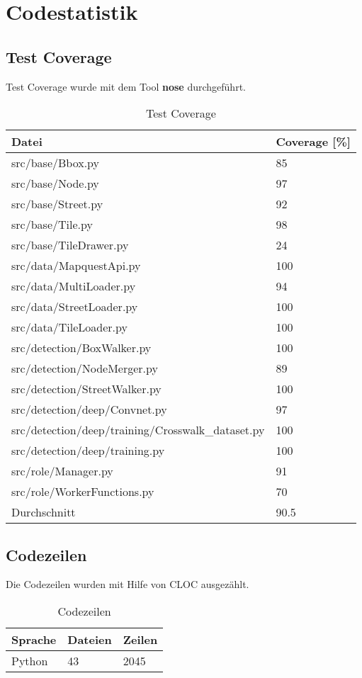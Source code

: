 \section{Codestatistik}
\subsection{Test Coverage}
Test Coverage wurde mit dem Tool \textbf{nose} durchgeführt. \\

\begin{table}[H]
\centering
    \begin{tabular}{|l|l|}
    \hline    
    \rowcolor{lightblue}
	Datei & Coverage [\%] \\ \hline
	src/base/Bbox.py & 85 \\ \hline    
	src/base/Node.py & 97 \\ \hline   
	src/base/Street.py & 92 \\ \hline  
	src/base/Tile.py & 98 \\ \hline   
	src/base/TileDrawer.py & 24 \\ \hline  
	src/data/MapquestApi.py & 100 \\ \hline   
	src/data/MultiLoader.py & 94 \\ \hline   
	src/data/StreetLoader.py & 100 \\ \hline   
	src/data/TileLoader.py & 100 \\ \hline   
	src/detection/BoxWalker.py & 100 \\ \hline   
	src/detection/NodeMerger.py & 89 \\ \hline  
	src/detection/StreetWalker.py & 100 \\ \hline   
	src/detection/deep/Convnet.py & 97 \\ \hline   
	src/detection/deep/training/Crosswalk\_dataset.py & 100 \\ \hline  
	src/detection/deep/training.py & 100 \\ \hline   
	src/role/Manager.py & 91 \\ \hline  
	src/role/WorkerFunctions.py & 70 \\ \hline
	\rowcolor{lightblue}
	Durchschnitt &   90.5 \\ \hline
    \end{tabular}
    \caption[Test Coverage]{Test Coverage}
\end{table}

\subsection{Codezeilen}
Die Codezeilen wurden mit Hilfe von CLOC \cite{CLOC} ausgezählt. \\

\begin{table}[H]
\centering
    \begin{tabular}{|p{3cm} |p{3cm} |p{3cm} |}
    \hline    
    \rowcolor{lightblue}
	Sprache & Dateien & Zeilen  \\ \hline   
	Python & 43 & 2045 \\ \hline
    \end{tabular}
    \caption[Codezeilen]{Codezeilen}
\end{table}

